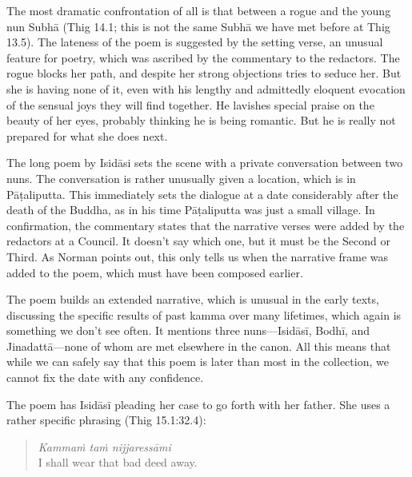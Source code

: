 \documentclass[12pt,openany]{book}%
\begin{document}
The most dramatic confrontation of all is that between a rogue and the young nun \textsanskrit{Subhā} (Thig 14.1; this is not the same \textsanskrit{Subhā} we have met before at Thig 13.5). The lateness of the poem is suggested by the setting verse, an unusual feature for poetry, which was ascribed by the commentary to the redactors. The rogue blocks her path, and despite her strong objections tries to seduce her. But she is having none of it, even with his lengthy and admittedly eloquent evocation of the sensual joys they will find together. He lavishes special praise on the beauty of her eyes, probably thinking he is being romantic. But he is really not prepared for what she does next.

The long poem by \textsanskrit{Isidāsi} sets the scene with a private conversation between two nuns. The conversation is rather unusually given a location, which is in \textsanskrit{Pāṭaliputta}. This immediately sets the dialogue at a date considerably after the death of the Buddha, as in his time \textsanskrit{Pāṭaliputta} was just a small village. In confirmation, the commentary states that the narrative verses were added by the redactors at a Council. It doesn’t say which one, but it must be the Second or Third. As Norman points out, this only tells us when the narrative frame was added to the poem, which must have been composed earlier.

The poem builds an extended narrative, which is unusual in the early texts, discussing the specific results of past kamma over many lifetimes, which again is something we don’t see often. It mentions three nuns—\textsanskrit{Isidāsī}, \textsanskrit{Bodhī}, and \textsanskrit{Jinadattā}—none of whom are met elsewhere in the canon. All this means that while we can safely say that this poem is later than most in the collection, we cannot fix the date with any confidence.

The poem has \textsanskrit{Isidāsī} pleading her case to go forth with her father. She uses a rather specific phrasing (Thig 15.1:32.4):

\begin{quotation}%
\textit{\textsanskrit{Kammaṁ} \textsanskrit{taṁ} \textsanskrit{nijjaressāmi}}\\

I shall wear that bad deed away.

%
\end{quotation}
\end{document}

